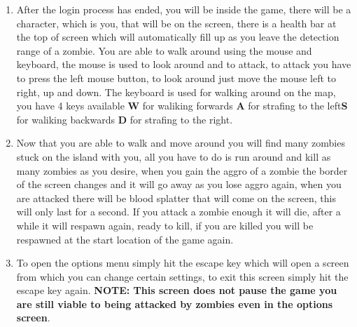 \documentclass[letterpaper]{article}
\begin{document}
\begin{enumerate}
\begin{itemize}
		\end{itemize}
		
		\item After the login process has ended, you will be inside the game, there will be a character, which is you, that will be on the screen, there is a health bar at the top of screen which will automatically fill up as you leave the detection range of a zombie. You are able to walk around using the mouse and keyboard, the mouse is used to look around and to attack, to attack you have to press the left mouse button, to look around just move the mouse left to right, up and down. The keyboard is used for walking around on the map, you have 4 keys available \textbf{W} for waliking forwards \textbf{A} for strafing to the left\textbf{S} for waliking backwards \textbf{D} for strafing to the right. \\
		
		\item Now that you are able to walk and move around you will find many zombies stuck on the island with you, all you have to do is run around and kill as many zombies as you desire, when you gain the aggro of a zombie the border of the screen changes and it will go away as you lose aggro again, when you are attacked there will be blood splatter that will come on the screen, this will only last for a second. If you attack a zombie enough it will die, after a while it will respawn again, ready to kill, if you are killed you will be respawned at the start location of the game again. \\
		
		\item To open the options menu simply hit the escape key which will open a screen from which you can change certain settings, to exit this screen simply hit the escape key again. \textbf{NOTE: This screen does not pause the game you are still viable to being attacked by zombies even in the options screen}. \\
		

\end{enumerate}
\end{document}
